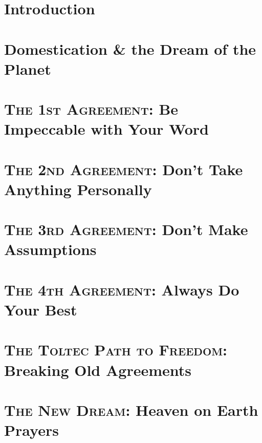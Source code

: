 \documentclass[oneside]{book}
\numberwithin{equation}{section}
\begin{document}
\section*{Introduction}

\section{Domestication \& the Dream of the Planet}

\section{\textsc{The 1st Agreement}: Be Impeccable with Your Word}

\section{\textsc{The 2nd Agreement}: Don't Take Anything Personally}

\section{\textsc{The 3rd Agreement}: Don't Make Assumptions}

\section{\textsc{The 4th Agreement}: Always Do Your Best}

\section{\textsc{The Toltec Path to Freedom}: Breaking Old Agreements}

\section{\textsc{The New Dream}: Heaven on Earth Prayers}




\printbibliography[heading=bibintoc]
	
\end{document}

